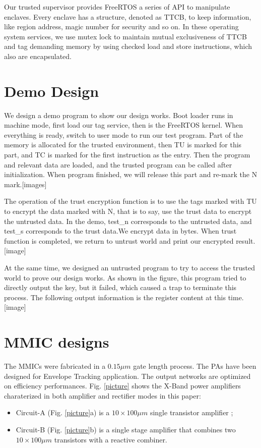 \documentclass[conference]{IEEEtran}
\begin{document}
Our trusted supervisor provides FreeRTOS a series of API to manipulate enclaves. Every enclave has a structure, denoted as TTCB, to keep information, like region address, magic number for security and so on. In these operating system services, we use mutex lock to maintain mutual exclusiveness of TTCB and tag demanding memory by using checked load and store instructions, which also are encapsulated.

\section{Demo Design}
We design a demo program to show our design works. Boot loader runs in machine mode, first load our tag service, then is the FreeRTOS kernel. When everything is ready, switch to user mode to run our test program. Part of the memory is allocated for the trusted environment, then TU is marked for this part, and TC is marked for the first instruction as the entry. Then the program and relevant data are loaded, and the trusted program can be called after initialization. When program finished, we will release this part and re-mark the N mark.[images]

The operation of the trust encryption function is to use the tags marked with TU to encrypt the data marked with N, that is to say, use the trust data to encrypt the untrusted data. In the demo, test\_n corresponds to the untrusted data, and test\_s corresponds to the trust data.We encrypt data in bytes. When  trust function is completed, we return to untrust world and print our encrypted result.[image]

At the same time, we designed an untrusted program to try to access the trusted world to prove our design works. As shown in the figure, this program tried to directly output the key, but it failed, which caused a trap to terminate this process. The following output information is the register content at this time.[image]




\section{MMIC designs}

The MMICs were fabricated in a $0.15\mu m$ gate length process. The PAs have been designed for Envelope Tracking application. The output networks are optimized on efficiency performances.
Fig. \ref{picture} shows the X-Band power amplifiers charaterized in both amplifier and rectifier modes in this paper:
\begin{itemize}
\item Circuit-A (Fig. \ref{picture}a) is a $10\times100\mu m$ single transistor amplifier ;
\item Circuit-B (Fig. \ref{picture}b) is a single stage amplifier that combines two $10\times100\mu m$ transistors with a reactive combiner.
\end{itemize}
\end{document}
